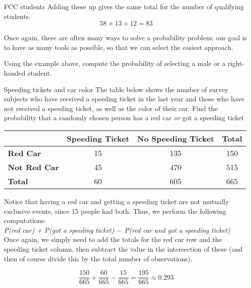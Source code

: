 \begin{example}[https://www.youtube.com/watch?v=Z3FKbz7RnSs&list=PLfmpjsIzhzts14-9s5QixRje97EI2oeMF&index=14]{FCC students}
Adding these up gives the same total for the number of qualifying students.
\[58 + 13 + 12 = 83\]

Once again, there are often many ways to solve a probability problem; our goal is to have as many tools as possible, so that we can select the easiest approach.
\end{example}

\begin{try}
Using the example above, compute the probability of selecting a male or a right-handed student. 
\end{try}
\vfill
\pagebreak

\begin{example}[https://www.youtube.com/watch?v=QE9xCoQBclw&list=PLfmpjsIzhzts14-9s5QixRje97EI2oeMF&index=15]{Speeding tickets and car color} 
The table below shows the number of survey subjects who have received a speeding ticket in the last year and those who have not received a speeding ticket, as well as the color of their car. Find the probability that a randomly chosen person has a red car \emph{or} got a speeding ticket
\begin{center}
\begin{tabular}{l | c c c}
 & \textbf{Speeding Ticket} & \textbf{No Speeding Ticket} & \textbf{Total} \\ \hline 
\textbf{Red Car} & 15 & 135 & 150\\
\textbf{Not Red Car} & 45 & 470 & 515  \\ \hline
\textbf{Total} & 60 & 605 & 665  
\end{tabular}
\end{center}	

\sol
Notice that having a red car and getting a speeding ticket are not mutually exclusive events, since 15 people had both. Thus, we perform the following computations: \\

\emph{P(red car) + P(got a speeding ticket) $-$ P(red car and got a speeding ticket)}\\

Once again, we simply need to add the totals for the red car row and the speeding ticket column, then subtract the value in the intersection of these (and then of course divide this by the total number of observations).

\[\frac{150}{665} + \frac{60}{665} - \frac{15}{665}  = \boxed{\frac{195}{665}  \approx 0.293}\]
\end{example}

